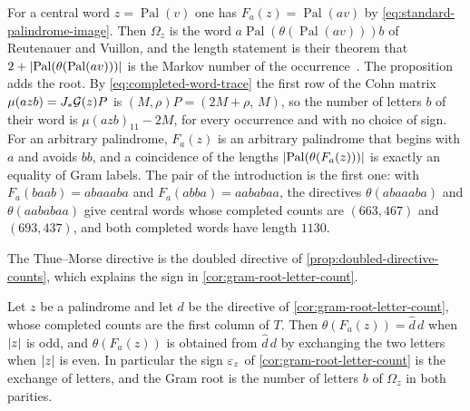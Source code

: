 For a central word $z=\operatorname{Pal}(v)$ one has $F_a(z)=\operatorname{Pal}(av)$ by
\eqref{eq:standard-palindrome-image}. Then $\Omega_z$ is the word
$a\operatorname{Pal}(\theta(\operatorname{Pal}(av)))b$ of Reutenauer and Vuillon, and the length
statement is their theorem that $2+\lvert\operatorname{Pal}(\theta(\operatorname{Pal}(av)))\rvert$
is the Markov number of the occurrence~\cite[Theorem~1]{ReutenauerVuillon2017}. The
proposition adds the root. By \eqref{eq:completed-word-trace} the first row of the Cohn
matrix $\mu(azb)=J_*\mathcal{G}(z)P$ is $(M,\rho)P=(2M+\rho,\,M)$, so the number of letters $b$ of
their word is $\mu(azb)_{11}-2M$, for every occurrence and with no choice of sign. For an
arbitrary palindrome, $F_a(z)$ is an arbitrary palindrome that begins with $a$ and avoids
$bb$, and a coincidence of the lengths
$\lvert\operatorname{Pal}(\theta(F_a(z)))\rvert$ is exactly an equality of Gram labels. The
pair of the introduction is the first one: with $F_a(baab)=abaaaba$ and $F_a(abba)=aababaa$,
the directives $\theta(abaaaba)$ and $\theta(aababaa)$ give central words whose completed counts
are $(663,467)$ and $(693,437)$, and both completed words have length $1130$.

The Thue--Morse directive is the doubled directive of
\cref{prop:doubled-directive-counts}, which explains the sign in
\cref{cor:gram-root-letter-count}.

\begin{corollary}
\label{cor:thue-morse-doubled}
Let $z$ be a palindrome and let $d$ be the directive of \cref{cor:gram-root-letter-count},
whose completed counts are the first column of $T$. Then $\theta(F_a(z))=\widehat d\,d$ when
$\lvert z\rvert$ is odd, and $\theta(F_a(z))$ is obtained from $\widehat d\,d$ by exchanging the two
letters when $\lvert z\rvert$ is even. In particular the sign $\varepsilon_z$ of
\cref{cor:gram-root-letter-count} is the exchange of letters, and the Gram root is the number
of letters $b$ of $\Omega_z$ in both parities.
\end{corollary}

